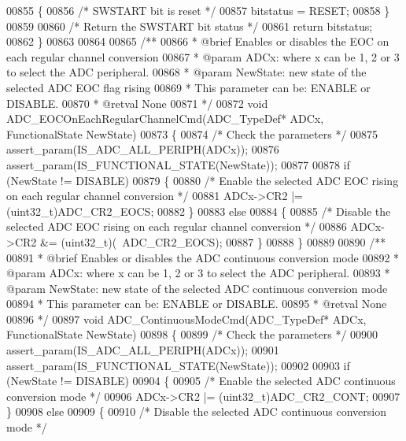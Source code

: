 \begin{DoxyCode}
00855   \{
00856     \textcolor{comment}{/* SWSTART bit is reset */}
00857     bitstatus = RESET;
00858   \}
00859 
00860   \textcolor{comment}{/* Return the SWSTART bit status */}
00861   \textcolor{keywordflow}{return}  bitstatus;
00862 \}
00863 
00864 
00865 \textcolor{comment}{/**}
00866 \textcolor{comment}{  * @brief  Enables or disables the EOC on each regular channel conversion}
00867 \textcolor{comment}{  * @param  ADCx: where x can be 1, 2 or 3 to select the ADC peripheral.}
00868 \textcolor{comment}{  * @param  NewState: new state of the selected ADC EOC flag rising}
00869 \textcolor{comment}{  *          This parameter can be: ENABLE or DISABLE.}
00870 \textcolor{comment}{  * @retval None}
00871 \textcolor{comment}{  */}
00872 \textcolor{keywordtype}{void} ADC_EOCOnEachRegularChannelCmd(ADC\_TypeDef* ADCx, FunctionalState NewState)
00873 \{
00874   \textcolor{comment}{/* Check the parameters */}
00875   assert_param(IS\_ADC\_ALL\_PERIPH(ADCx));
00876   assert_param(IS\_FUNCTIONAL\_STATE(NewState));
00877 
00878   \textcolor{keywordflow}{if} (NewState != DISABLE)
00879   \{
00880     \textcolor{comment}{/* Enable the selected ADC EOC rising on each regular channel conversion */}
00881     ADCx->CR2 |= (uint32\_t)ADC_CR2_EOCS;
00882   \}
00883   \textcolor{keywordflow}{else}
00884   \{
00885     \textcolor{comment}{/* Disable the selected ADC EOC rising on each regular channel conversion */}
00886     ADCx->CR2 &= (uint32\_t)(~ADC_CR2_EOCS);
00887   \}
00888 \}
00889 
00890 \textcolor{comment}{/**}
00891 \textcolor{comment}{  * @brief  Enables or disables the ADC continuous conversion mode }
00892 \textcolor{comment}{  * @param  ADCx: where x can be 1, 2 or 3 to select the ADC peripheral.}
00893 \textcolor{comment}{  * @param  NewState: new state of the selected ADC continuous conversion mode}
00894 \textcolor{comment}{  *          This parameter can be: ENABLE or DISABLE.}
00895 \textcolor{comment}{  * @retval None}
00896 \textcolor{comment}{  */}
00897 \textcolor{keywordtype}{void} ADC_ContinuousModeCmd(ADC\_TypeDef* ADCx, FunctionalState NewState)
00898 \{
00899   \textcolor{comment}{/* Check the parameters */}
00900   assert_param(IS\_ADC\_ALL\_PERIPH(ADCx));
00901   assert_param(IS\_FUNCTIONAL\_STATE(NewState));
00902 
00903   \textcolor{keywordflow}{if} (NewState != DISABLE)
00904   \{
00905     \textcolor{comment}{/* Enable the selected ADC continuous conversion mode */}
00906     ADCx->CR2 |= (uint32\_t)ADC_CR2_CONT;
00907   \}
00908   \textcolor{keywordflow}{else}
00909   \{
00910     \textcolor{comment}{/* Disable the selected ADC continuous conversion mode */}

\end{DoxyCode}
